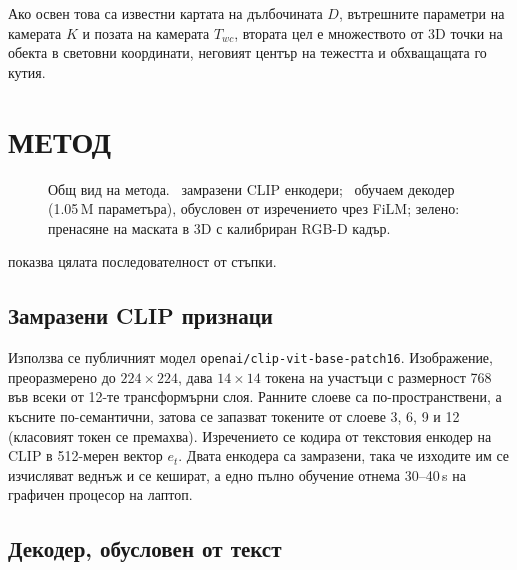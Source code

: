 \documentclass[conference,a4paper]{IEEEtran}
\newcommand{\bgsc}[2]{\texorpdfstring{#1{\footnotesize\MakeUppercase{#2}}}{#1#2}}
\newcommand{\code}[1]{\textlatin{\texttt{#1}}}
\begin{document}
Ако освен това са известни картата на дълбочината $D$, вътрешните параметри на камерата $K$ и
позата на камерата $T_{wc}$, втората цел е множеството от 3D точки на обекта в световни
координати, неговият център на тежестта и обхващащата го кутия.

\section{\bgsc{М}{етод}}
\label{sec:method}

\begin{figure}[t]
\centering
\resizebox{\textwidth}{!}{}
\caption{Общ вид на метода. \textcolor{blue!55!cyan}{\faSnowflake}~замразени CLIP енкодери;
\textcolor{orange!85!red}{\faFire}~обучаем декодер (1.05\,M параметъра), обусловен от изречението
чрез FiLM; зелено: пренасяне на маската в 3D с калибриран RGB-D кадър.}
\label{fig:pipeline}
\end{figure}

 показва цялата последователност от стъпки.

\subsection{Замразени CLIP признаци}

Използва се публичният модел \code{openai/clip-vit-base-patch16}. Изображение, преоразмерено до
$224\times224$, дава $14\times14$ токена на участъци с размерност 768 във всеки от 12-те
трансформърни слоя. Ранните слоеве са по-пространствени, а късните по-семантични, затова се запазват
токените от слоеве 3, 6, 9 и 12 (класовият токен се премахва). Изречението се кодира от текстовия
енкодер на CLIP в 512-мерен вектор $e_t$. Двата енкодера са замразени, така че изходите им се
изчисляват веднъж и се кешират, а едно пълно обучение отнема 30--40\,s на графичен процесор на
лаптоп.

\subsection{Декодер, обусловен от текст}
\end{document}
